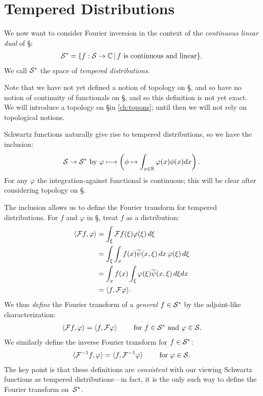     \section{Tempered Distributions}
      \label{sec:tempdist}
      We now want to consider Fourier inversion in the context of the \emph{continuous linear dual} of \S:
      \begin{align*}
        \S^* = \{f:\S\rightarrow\C\,\vert\,f\text{ is continuous and linear}\} \text{.}
      \end{align*}
      We call $\S^*$ the space of \emph{tempered distributions}.

      Note that we have not yet defined a notion of topology on \S, and so have no notion of continuity of functionals on \S, and so this definition is not yet exact.
      We will introduce a topology on \S in \cref{ch:topons}; until then we will not rely on topological notions.

      Schwartz functions naturally give rise to tempered distributions, so we have the inclusion:
      \begin{align*}
        \S\rightarrow\S^*\text{ by }\varphi \longmapsto\left(\phi\mapsto\int_{x\in\R}\varphi(x)\phi(x)dx\right) \text{.}
      \end{align*}
      For any $\varphi$ the integration-against functional is continuous; this will be clear after considering topology on \S.
      
      The inclusion allows us to define the Fourier transform for tempered distributions.
      For $f$ and $\varphi$ in \S, treat $f$ as a distribution:
      \begin{align*}
        \langle\F f,\varphi\rangle &= \int_\xi\F f(\xi)\varphi(\xi)\,d\xi\\
        &= \int_\xi\int_xf(x)\overline\psi(x,\xi)\,dx\,\varphi(\xi)\,d\xi\\
        &= \int_xf(x)\int_\xi\varphi(\xi)\overline\psi(x,\xi)\,d\xi dx\\
        &= \langle f,\F\varphi\rangle \text{.}
      \end{align*}
      We thus \emph{define} the Fourier transform of a \emph{general} $f\in\S^*$ by the adjoint-like characterization:
      \begin{align*}
        \langle\F f,\varphi\rangle = \langle f,\F\varphi\rangle\qquad\text{ for }f\in\S^*\text{ and }\varphi\in\S \text{.}
      \end{align*}
      We similarly define the inverse Fourier transform for $f\in\S^*$:
      \begin{align*}
        \langle\F^{-1}f,\varphi\rangle = \langle f,\F^{-1}\varphi\rangle\qquad\text{ for }\varphi\in\S \text{.}
      \end{align*}
      The key point is that these definitions are \emph{consistent} with our viewing Schwartz functions as tempered distributions---in fact, it is the only such way to define the Fourier transform on~$\S^*$.

